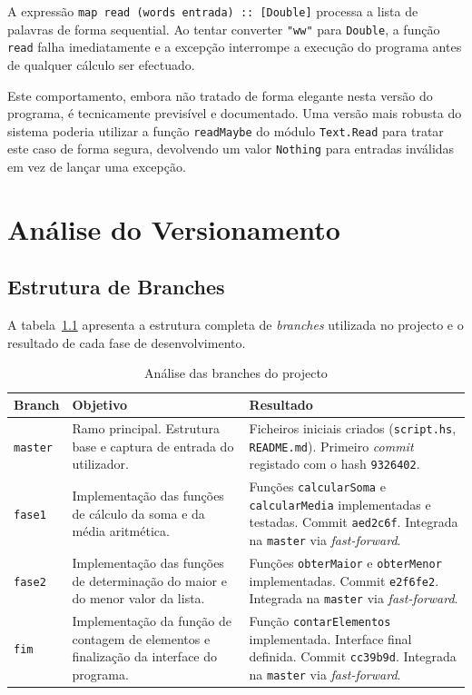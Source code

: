 \documentclass[12pt, a4paper, oneside]{report}
\begin{document}
A expressão \texttt{map read (words entrada) :: [Double]} processa a lista de palavras de forma sequential. Ao tentar converter \texttt{"ww"} para \texttt{Double}, a função \texttt{read} falha imediatamente e a excepção interrompe a execução do programa antes de qualquer cálculo ser efectuado.

Este comportamento, embora não tratado de forma elegante nesta versão do programa, é tecnicamente previsível e documentado. Uma versão mais robusta do sistema poderia utilizar a função \texttt{readMaybe} do módulo \texttt{Text.Read} para tratar este caso de forma segura, devolvendo um valor \texttt{Nothing} para entradas inválidas em vez de lançar uma excepção.

\chapter{Análise do Versionamento}

\section{Estrutura de Branches}

A tabela~\ref{tab:branches} apresenta a estrutura completa de \textit{branches} utilizada no projecto e o resultado de cada fase de desenvolvimento.

\begin{table}[H]
\centering
\caption{Análise das branches do projecto}
\label{tab:branches}
\begin{tabular}{p{2.5cm} p{5cm} p{5.5cm}}
\toprule
\bfseries Branch & \bfseries Objetivo & \bfseries Resultado \\
\midrule
\texttt{master} & Ramo principal. Estrutura base e captura de entrada do utilizador. & Ficheiros iniciais criados (\texttt{script.hs}, \texttt{README.md}). Primeiro \textit{commit} registado com o hash \texttt{9326402}. \\
\addlinespace
\texttt{fase1} & Implementação das funções de cálculo da soma e da média aritmética. & Funções \texttt{calcularSoma} e \texttt{calcularMedia} implementadas e testadas. Commit \texttt{aed2c6f}. Integrada na \texttt{master} via \textit{fast-forward}. \\
\addlinespace
\texttt{fase2} & Implementação das funções de determinação do maior e do menor valor da lista. & Funções \texttt{obterMaior} e \texttt{obterMenor} implementadas. Commit \texttt{e2f6fe2}. Integrada na \texttt{master} via \textit{fast-forward}. \\
\addlinespace
\texttt{fim} & Implementação da função de contagem de elementos e finalização da interface do programa. & Função \texttt{contarElementos} implementada. Interface final definida. Commit \texttt{cc39b9d}. Integrada na \texttt{master} via \textit{fast-forward}. \\
\bottomrule
\end{tabular}
\end{table}
\end{document}
